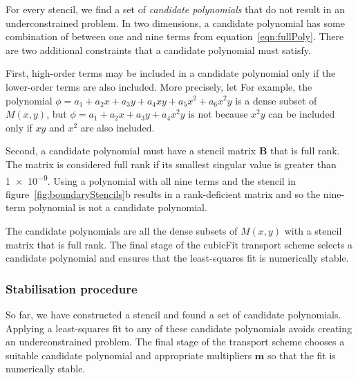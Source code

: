 For every stencil, we find a set of \textit{candidate polynomials} that do not result in an underconstrained problem.
In two dimensions, a candidate polynomial has some combination of between one and nine terms from equation~\eqref{eqn:fullPoly}.  There are two additional constraints that a candidate polynomial must satisfy.

First, high-order terms may be included in a candidate polynomial only if the lower-order terms are also included.
More precisely, let
For example, the polynomial $\phi = a_1 + a_2 x + a_3 y + a_4 xy + a_5 x^2 + a_6 x^2 y$ is a dense subset of $M(x,y)$, but $\phi = a_1 + a_2 x + a_3 y + a_4 x^2 y$ is not because $x^2 y$ can be included only if $xy$ and $x^2$ are also included.

Second, a candidate polynomial must have a stencil matrix $\mathbf{B}$ that is full rank.  The matrix is considered full rank if its smallest singular value is greater than \num{1e-9}.
Using a polynomial with all nine terms and the stencil in figure~\ref{fig:boundaryStencils}b results in a rank-deficient matrix and so the nine-term polynomial is not a candidate polynomial.

The candidate polynomials are all the dense subsets of $M(x,y)$  with a stencil matrix that is full rank.  The final stage of the cubicFit transport scheme selects a candidate polynomial and ensures that the least-squares fit is numerically stable.

\subsubsection{Stabilisation procedure}
\label{sec:stabilisation}
So far, we have constructed a stencil and found a set of candidate polynomials.  Applying a least-squares fit to any of these candidate polynomials avoids creating an underconstrained problem.  The final stage of the transport scheme chooses a suitable candidate polynomial and appropriate multipliers $\mathbf{m}$ so that the fit is numerically stable.

